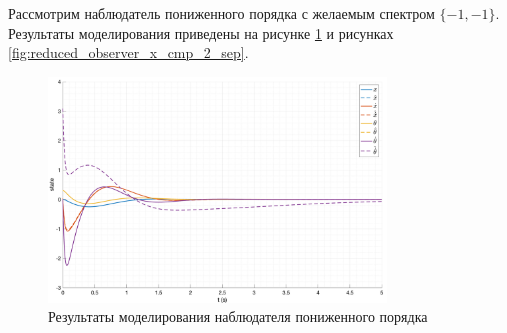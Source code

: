Рассмотрим наблюдатель пониженного порядка с желаемым спектром $\{-1, -1\}$.
Результаты моделирования приведены на рисунке \ref{fig:reduced_observer_x_2} и рисунках \ref{fig:reduced_observer_x_cmp_2_sep}.
\begin{figure}[ht!]
    \centering
    \includegraphics[width=0.8\textwidth]{media/plots/reduced_observer/reduced_observer_cmp_2.png}
    \caption{Результаты моделирования наблюдателя пониженного порядка}
    \label{fig:reduced_observer_x_2}
\end{figure}
